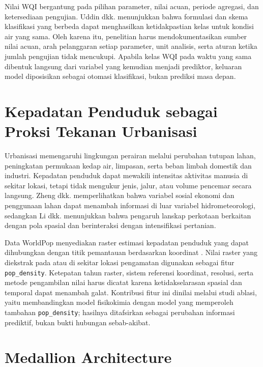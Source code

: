 Nilai WQI bergantung pada pilihan parameter, nilai acuan, periode agregasi, dan ketersediaan pengujian. Uddin dkk. \cite{uddin_performance_2023} menunjukkan bahwa formulasi dan skema klasifikasi yang berbeda dapat menghasilkan ketidakpastian kelas untuk kondisi air yang sama. Oleh karena itu, penelitian harus mendokumentasikan sumber nilai acuan, arah pelanggaran setiap parameter, unit analisis, serta aturan ketika jumlah pengujian tidak mencukupi. Apabila kelas WQI pada waktu yang sama dibentuk langsung dari variabel yang kemudian menjadi prediktor, keluaran model diposisikan sebagai otomasi klasifikasi, bukan prediksi masa depan.

\section{Kepadatan Penduduk sebagai Proksi Tekanan Urbanisasi}

Urbanisasi memengaruhi lingkungan perairan melalui perubahan tutupan lahan, peningkatan permukaan kedap air, limpasan, serta beban limbah domestik dan industri. Kepadatan penduduk dapat mewakili intensitas aktivitas manusia di sekitar lokasi, tetapi tidak mengukur jenis, jalur, atau volume pencemar secara langsung. Zheng dkk. \cite{zheng_large_2023} memperlihatkan bahwa variabel sosial ekonomi dan penggunaan lahan dapat menambah informasi di luar variabel hidrometeorologi, sedangkan Li dkk. \cite{li_urbanization_2023} menunjukkan bahwa pengaruh lanskap perkotaan berkaitan dengan pola spasial dan berinteraksi dengan intensifikasi pertanian.

Data WorldPop menyediakan raster estimasi kepadatan penduduk yang dapat dihubungkan dengan titik pemantauan berdasarkan koordinat \cite{worldpop_uk_density}. Nilai raster yang diekstrak pada atau di sekitar lokasi pengamatan digunakan sebagai fitur \texttt{pop\_density}. Ketepatan tahun raster, sistem referensi koordinat, resolusi, serta metode pengambilan nilai harus dicatat karena ketidakselarasan spasial dan temporal dapat menambah galat. Kontribusi fitur ini dinilai melalui studi ablasi, yaitu membandingkan model fisikokimia dengan model yang memperoleh tambahan \texttt{pop\_density}; hasilnya ditafsirkan sebagai perubahan informasi prediktif, bukan bukti hubungan sebab-akibat.

\section{Medallion Architecture}

